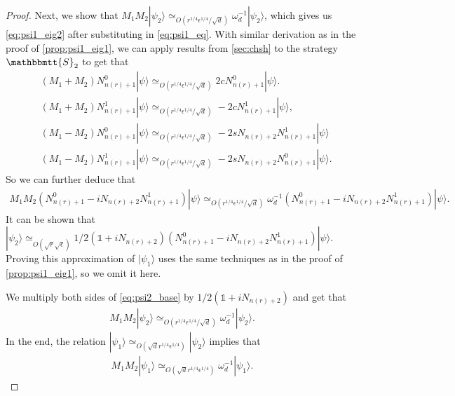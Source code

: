 \documentclass[11pt,letterpaper]{article}
\newcommand{\ket}[1]{|#1\rangle}
\newcommand{\1}{\mathbb{1}}
\newcommand{\nr}{n(r)}
\newcommand{\bS}{\mathbbmtt{S}}
\newcommand{\se}{\sqrt{\epsilon}}
\newcommand{\qe}{\epsilon^{1/4}}
\newcommand{\sd}{\sqrt{d}}
\newcommand{\sr}{\sqrt{r}}
\newcommand{\qr}{r^{1/4}}
\newcommand{\appd}[1]{\simeq_{#1}}
\theoremstyle{definition}
\begin{document}
\begin{proof}
	Next, we show that $M_1M_2 \ket{\psi_2}\appd{O(\qr \qe/\sd)} \omega_d^{-1} \ket{\psi_2}$, which gives
	us \cref{eq:psi1_eig2} after substituting in \cref{eq:psi1_eq}.
	With similar derivation as in the proof of \cref{prop:psi1_eig1}, we can apply results from \cref{sec:chsh}
	to the strategy $\bS_2$ to get that
	\begin{align}
		&(M_1+M_2) N_{\nr+1}^0 \ket{\psi} \appd{O(\qr \qe/\sd)} 2c N_{\nr+1}^0 \ket{\psi}.\\
		&(M_1+M_2) N_{\nr+1}^1 \ket{\psi}  \appd{O(\qr \qe/\sd)} -2cN_{\nr+1}^1 \ket{\psi},\\
		&(M_1-M_2) N_{\nr+1}^0\ket{\psi} \appd{O(\qr\qe/\sd)}-2sN_{\nr+2} N_{\nr+1}^1\ket{\psi}\\
		&(M_1-M_2)N_{\nr+1}^1 \ket{\psi} \appd{O(\qr\qe/\sd)} -2sN_{\nr+2} N_{\nr+1}^0 \ket{\psi}.
	\end{align}
	So we can further deduce that 
	\begin{align}
	\label{eq:psi2_base}
		M_1M_2 (N_{\nr+1}^0 - i N_{\nr+2}N_{\nr+1}^1) \ket{\psi} \appd{O(\qr \qe/\sd)} 
		\omega_d^{-1} (N_{\nr+1}^0 - i N_{\nr+2}N_{\nr+1}^1)\ket{\psi} .
	\end{align}
	It can be shown that $\ket{\psi_2} \appd{O(\sr \se)} 1/2(\1+iN_{\nr+2})(N_{\nr+1}^0 - i N_{\nr+2}N_{\nr+1}^1) \ket{\psi}$. 
	Proving this approximation of $\ket{\psi_1}$
	uses the same techniques as in the proof of \cref{prop:psi1_eig1}, so we omit it here.
	
	We multiply both sides of \cref{eq:psi2_base} by $1/2(\1+iN_{\nr+2})$ and get that
	\begin{align}
		M_1M_2 \ket{\psi_2} \appd{O(\qr \qe/\sd)} \omega_d^{-1}\ket{\psi_2}.
	\end{align}
	In the end, the relation $\ket{\psi_1}  \appd{O(\sd \qr\qe)} \ket{\psi_2}$ implies that 
	\begin{align}
		M_1M_2 \ket{\psi_1} \appd{O(\sd \qr \qe)} \omega_d^{-1}\ket{\psi_1}.
	\end{align}
\end{proof}
\end{document}

